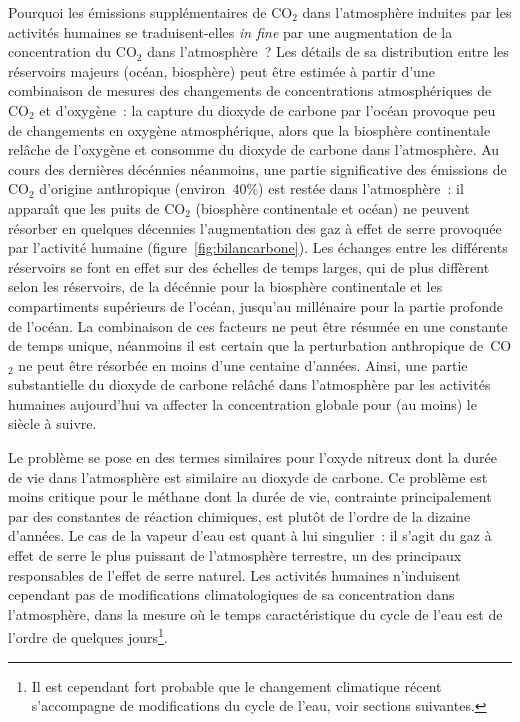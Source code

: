 \sk
Pourquoi les émissions supplémentaires de CO$_2$ dans l'atmosphère induites par les activités humaines se traduisent-elles \emph{in fine} par une augmentation de la concentration du CO$_2$ dans l'atmosphère~? Les détails de sa distribution entre les réservoirs majeurs (océan, biosphère) peut être estimée à partir d'une combinaison de mesures des changements de concentrations atmosphériques de CO$_2$ et d'oxygène~: la capture du dioxyde de carbone par l'océan provoque peu de changements en oxygène atmosphérique, alors que la biosphère continentale relâche de l'oxygène et consomme du dioxyde de carbone dans l'atmosphère. Au cours des dernières décénnies néanmoins, une partie significative des émissions de CO$_2$ d'origine anthropique (environ~$40\%$) est restée dans l'atmosphère~: il apparaît que les puits de CO$_2$ (biosphère continentale et océan) ne peuvent résorber en quelques décennies l'augmentation des gaz à effet de serre provoquée par l'activité humaine (figure~\ref{fig:bilancarbone}). Les échanges entre les différents réservoirs se font en effet sur des échelles de temps larges, qui de plus diffèrent selon les réservoirs, de la décénnie pour la biosphère continentale et les compartiments supérieurs de l'océan, jusqu'au millénaire pour la partie profonde de l'océan. La combinaison de ces facteurs ne peut être résumée en une constante de temps unique, néanmoins il est certain que la perturbation anthropique de~CO$_2$ ne peut être résorbée en moins d'une centaine d'années. Ainsi, une partie substantielle du dioxyde de carbone relâché dans l'atmosphère par les activités humaines aujourd'hui va affecter la concentration globale pour (au moins) le siècle à suivre. 

\sk
Le problème se pose en des termes similaires pour l'oxyde nitreux dont la durée de vie dans l'atmosphère est similaire au dioxyde de carbone. Ce problème est moins critique pour le méthane dont la durée de vie, contrainte principalement par des constantes de réaction chimiques, est plutôt de l'ordre de la dizaine d'années. Le cas de la vapeur d'eau est quant à lui singulier~: il s'agit du gaz à effet de serre le plus puissant de l'atmosphère terrestre, un des principaux responsables de l'effet de serre naturel. Les activités humaines n'induisent cependant pas de modifications climatologiques de sa concentration dans l'atmosphère, dans la mesure où le temps caractéristique du cycle de l'eau est de l'ordre de quelques jours\footnote{Il est cependant fort probable que le changement climatique récent s'accompagne de modifications du cycle de l'eau, voir sections suivantes.}.

